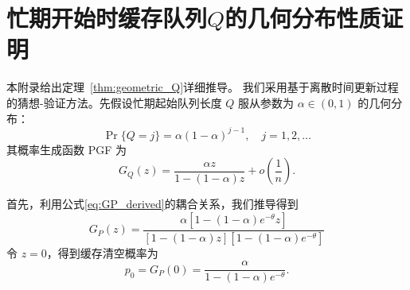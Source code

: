 \chapter[忙期开始时缓存队列Q的几何分布性质证明]{忙期开始时缓存队列$Q$的几何分布性质证明}
\label{app:proof_theorem_fixed_point}

本附录给出定理\texorpdfstring{~\ref{thm:geometric_Q}}的详细推导。
我们采用基于离散时间更新过程的猜想-验证方法\cite{1996_Gausian}。先假设忙期起始队列长度 $Q$ 服从参数为 $\alpha\in(0,1)$ 的几何分布：
\begin{equation}
\Pr\{Q=j\}=\alpha(1-\alpha)^{j-1},\quad j=1,2,\ldots
\end{equation}
其概率生成函数 PGF 为
\begin{equation}
\label{eq:GQ_ansatz}
G_Q(z)=\frac{\alpha z}{1-(1-\alpha)z}+o\!\left(\frac{1}{n}\right).
\end{equation}

首先，利用公式\eqref{eq:GP_derived}的耦合关系，我们推导得到
\begin{equation}
\label{eq:GP_alpha}
G_{P}(z) = \frac{\alpha \left[ 1 - (1 - \alpha) e^{-\theta} z \right]}{[1 - (1 - \alpha) z] \left[ 1 - (1 - \alpha) e^{-\theta} \right]}
\end{equation}
令 $z=0$，得到缓存清空概率为
\begin{equation}
\label{eq:p0_alpha}
p_0 = G_P(0) = \frac{\alpha}{1 - (1 - \alpha) e^{-\theta}}.
\end{equation}


